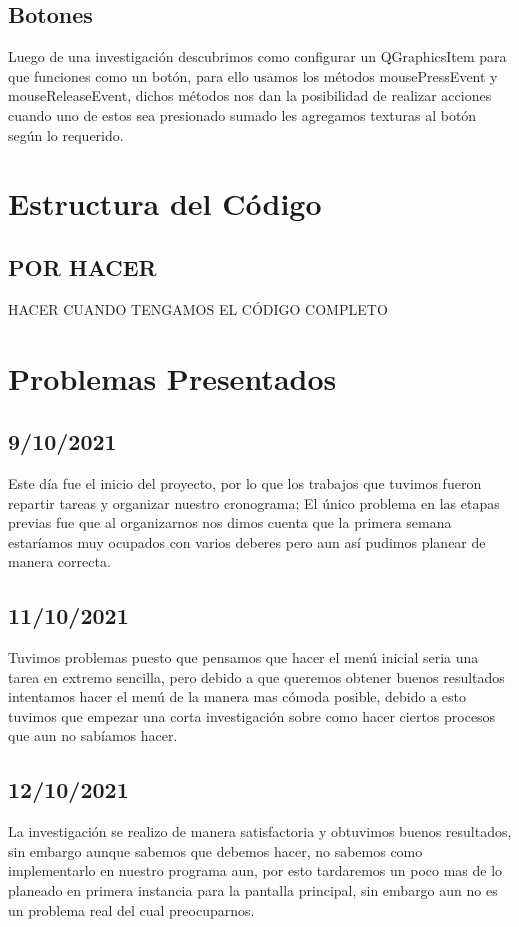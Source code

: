 \documentclass{article}
\begin{document}
    \subsection{Botones}
    Luego de una investigación descubrimos como configurar un QGraphicsItem para que funciones como un botón, para ello usamos los métodos mousePressEvent y mouseReleaseEvent, dichos métodos nos dan la posibilidad de realizar acciones cuando uno de estos sea presionado sumado les agregamos texturas al botón según lo requerido. 
        
        
\section{Estructura del Código}
    \subsection{POR HACER}
    HACER CUANDO TENGAMOS EL CÓDIGO COMPLETO
    
\section{Problemas Presentados}
    \subsection{9/10/2021}
    Este día fue el inicio del proyecto, por lo que los trabajos que tuvimos fueron repartir tareas y organizar nuestro cronograma; El único problema en las etapas previas fue que al organizarnos nos dimos cuenta que la primera semana estaríamos muy ocupados con varios deberes pero aun así pudimos planear de manera correcta.

    \subsection{11/10/2021}
    Tuvimos problemas puesto que pensamos que hacer el menú inicial seria una tarea en extremo sencilla, pero debido a que queremos obtener buenos resultados intentamos hacer el menú de la manera mas cómoda posible, debido a esto tuvimos que empezar una corta investigación sobre como hacer ciertos procesos que aun no sabíamos hacer.
    
    \subsection{12/10/2021}
    La investigación se realizo de manera satisfactoria y obtuvimos buenos resultados, sin embargo aunque sabemos que debemos hacer, no sabemos como implementarlo en nuestro programa aun, por esto tardaremos un poco mas de lo planeado en primera instancia para la pantalla principal, sin embargo aun no es un problema real del cual preocuparnos.
    
\end{document}
